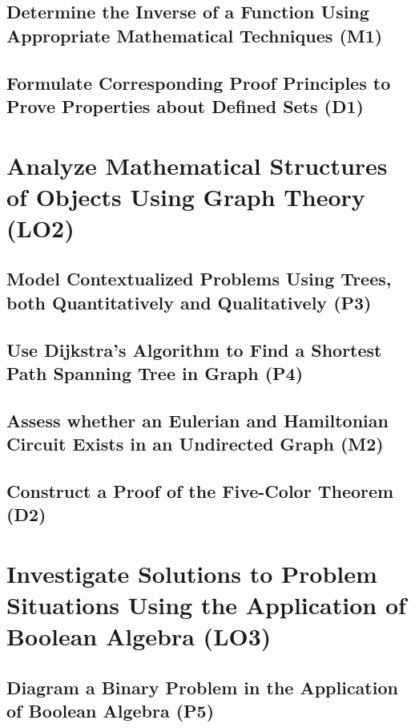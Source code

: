 \documentclass[12pt, a4paper, twoside]{report} %
\begin{document}
\section{Determine the Inverse of a Function Using Appropriate Mathematical Techniques (M1)}

\label{sec:M1}

\section{Formulate Corresponding Proof Principles to Prove Properties about Defined Sets (D1)}

\label{sec:D1}

\chapter{Analyze Mathematical Structures of Objects Using Graph Theory (LO2)}
\label{chap:LO2}

\section{Model Contextualized Problems Using Trees, both Quantitatively and Qualitatively (P3)}
\label{sec:P3}


\section{Use Dijkstra’s Algorithm to Find a Shortest Path Spanning Tree in Graph (P4)}
\label{sec:P4}

\section{Assess whether an Eulerian and Hamiltonian Circuit Exists in an Undirected Graph (M2)}
\label{sec:M2}

\section{Construct a Proof of the Five-Color Theorem (D2)}
\label{sec:D2}

\chapter{Investigate Solutions to Problem Situations Using the Application of Boolean Algebra (LO3)}
\label{chap:LO3}

\section{Diagram a Binary Problem in the Application of Boolean Algebra (P5)}
\label{sec:P5}
\end{document}
